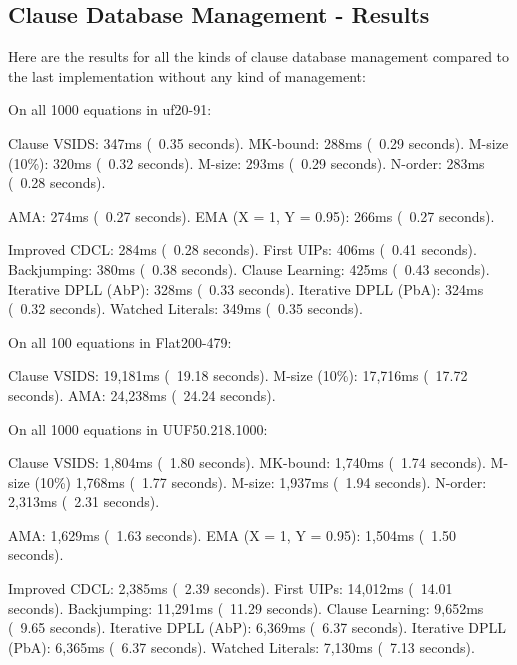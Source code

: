 \subsection{Clause Database Management - Results}

Here are the results for all the kinds of clause database management compared to 
the last implementation without any kind of management:

\begin{FVerbatim}
On all 1000 equations in uf20-91:

Clause VSIDS:               347ms (~0.35 seconds).
MK-bound:                   288ms (~0.29 seconds).
M-size (10\%):              320ms (~0.32 seconds).
M-size:                     293ms (~0.29 seconds).
N-order:                    283ms (~0.28 seconds).

AMA:                        274ms (~0.27 seconds).
EMA (X = 1, Y = 0.95):      266ms (~0.27 seconds).

Improved CDCL:              284ms (~0.28 seconds).
First UIPs:                 406ms (~0.41 seconds).
Backjumping:                380ms (~0.38 seconds).
Clause Learning:            425ms (~0.43 seconds).
Iterative DPLL (AbP):       328ms (~0.33 seconds).
Iterative DPLL (PbA):       324ms (~0.32 seconds).
Watched Literals:           349ms (~0.35 seconds).

On all 100 equations in Flat200-479:

Clause VSIDS:   19,181ms (~19.18 seconds).
M-size (10\%):  17,716ms (~17.72 seconds).
AMA:            24,238ms (~24.24 seconds).

On all 1000 equations in UUF50.218.1000:

Clause VSIDS:               1,804ms (~1.80 seconds).
MK-bound:                   1,740ms (~1.74 seconds).
M-size (10\%)               1,768ms (~1.77 seconds).
M-size:                     1,937ms (~1.94 seconds).
N-order:                    2,313ms (~2.31 seconds).

AMA:                        1,629ms (~1.63 seconds).
EMA (X = 1, Y = 0.95):      1,504ms (~1.50 seconds).

Improved CDCL:              2,385ms (~2.39 seconds).
First UIPs:                 14,012ms (~14.01 seconds).
Backjumping:                11,291ms (~11.29 seconds).
Clause Learning:            9,652ms (~9.65 seconds).
Iterative DPLL (AbP):       6,369ms (~6.37 seconds).
Iterative DPLL (PbA):       6,365ms (~6.37 seconds).
Watched Literals:           7,130ms (~7.13 seconds).
\end{FVerbatim}
\noindent

